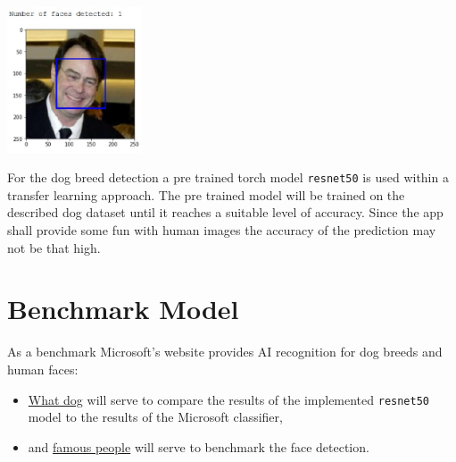 \documentclass[paper=A4, DIV=11, parskip=half]{scrartcl}
\begin{document}
\begin{center}
  \includegraphics[width=4cm]{images/dan_ackroyd_bounding_box.jpg}
\end{center}

For the dog breed detection a pre trained torch model \texttt{resnet50} is used within a
transfer learning approach. The pre trained model will be trained on the described dog
dataset until it reaches a suitable level of accuracy. Since the app shall provide some
fun with human images the accuracy of the prediction may not be that high.


\section*{Benchmark Model}

As a benchmark Microsoft's website provides AI recognition for dog breeds and human faces:
\begin{itemize}
  \item \href{https://www.bing.com/visualsearch/Microsoft/WhatDog}{What dog} will serve to compare
the results of the implemented \texttt{resnet50} model to the results of the Microsoft
classifier,
\item and \href{https://www.bing.com/visualsearch/Microsoft/Famouspeople}{famous people}
will serve to benchmark the face detection.
\end{itemize}

\end{document}
